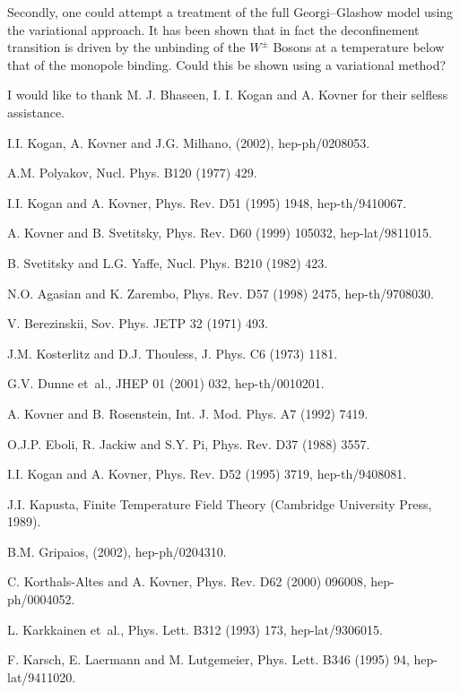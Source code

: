 \documentclass[a4paper,a4paper]{article}
\begin{document}
Secondly, one could attempt a treatment of the full Georgi--Glashow model using the variational approach. 
It has been shown \cite{Dunne:2000vp} 
that in fact the deconfinement transition is driven by the unbinding of the $W^{\pm}$ Bosons at a temperature
below that of the monopole binding. Could this be shown using a variational method?


I would like to thank M. J. Bhaseen, I. I. Kogan and A. Kovner for their selfless assistance.
\begin{thebibliography}{10}

I.I. Kogan, A. Kovner and J.G. Milhano,
\newblock (2002), hep-ph/0208053.

A.M. Polyakov,
\newblock Nucl. Phys. B120 (1977) 429.

I.I. Kogan and A. Kovner,
\newblock Phys. Rev. D51 (1995) 1948, hep-th/9410067.

A. Kovner and B. Svetitsky,
\newblock Phys. Rev. D60 (1999) 105032, hep-lat/9811015.

B. Svetitsky and L.G. Yaffe,
\newblock Nucl. Phys. B210 (1982) 423.

N.O. Agasian and K. Zarembo,
\newblock Phys. Rev. D57 (1998) 2475, hep-th/9708030.

V. Berezinskii,
\newblock Sov. Phys. JETP 32 (1971) 493.

J.M. Kosterlitz and D.J. Thouless,
\newblock J. Phys. C6 (1973) 1181.

G.V. Dunne et~al.,
\newblock JHEP 01 (2001) 032, hep-th/0010201.

A. Kovner and B. Rosenstein,
\newblock Int. J. Mod. Phys. A7 (1992) 7419.

O.J.P. Eboli, R. Jackiw and S.Y. Pi,
\newblock Phys. Rev. D37 (1988) 3557.

I.I. Kogan and A. Kovner,
\newblock Phys. Rev. D52 (1995) 3719, hep-th/9408081.

J.I. Kapusta,
\newblock Finite Temperature Field Theory (Cambridge University Press, 1989).

B.M. Gripaios,
\newblock (2002), hep-ph/0204310.

C. Korthals-Altes and A. Kovner,
\newblock Phys. Rev. D62 (2000) 096008, hep-ph/0004052.

L. Karkkainen et~al.,
\newblock Phys. Lett. B312 (1993) 173, hep-lat/9306015.

F. Karsch, E. Laermann and M. Lutgemeier,
\newblock Phys. Lett. B346 (1995) 94, hep-lat/9411020.

\end{thebibliography}
\end{document}

